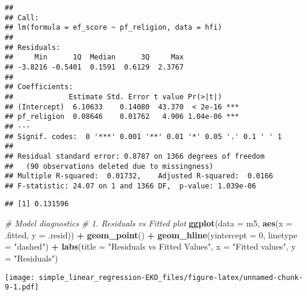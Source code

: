 \documentclass[
]{article}
\newenvironment{Shaded}{\begin{snugshade}}{\end{snugshade}}
\newcommand{\AttributeTok}[1]{\textcolor[rgb]{0.13,0.29,0.53}{#1}}
\newcommand{\CommentTok}[1]{\textcolor[rgb]{0.56,0.35,0.01}{\textit{#1}}}
\newcommand{\DecValTok}[1]{\textcolor[rgb]{0.00,0.00,0.81}{#1}}
\newcommand{\FunctionTok}[1]{\textcolor[rgb]{0.13,0.29,0.53}{\textbf{#1}}}
\newcommand{\NormalTok}[1]{#1}
\newcommand{\SpecialCharTok}[1]{\textcolor[rgb]{0.81,0.36,0.00}{\textbf{#1}}}
\newcommand{\StringTok}[1]{\textcolor[rgb]{0.31,0.60,0.02}{#1}}
\begin{document}
\begin{verbatim}
## 
## Call:
## lm(formula = ef_score ~ pf_religion, data = hfi)
## 
## Residuals:
##     Min      1Q  Median      3Q     Max 
## -3.8216 -0.5401  0.1591  0.6129  2.3767 
## 
## Coefficients:
##             Estimate Std. Error t value Pr(>|t|)    
## (Intercept)  6.10633    0.14080  43.370  < 2e-16 ***
## pf_religion  0.08646    0.01762   4.906 1.04e-06 ***
## ---
## Signif. codes:  0 '***' 0.001 '**' 0.01 '*' 0.05 '.' 0.1 ' ' 1
## 
## Residual standard error: 0.8787 on 1366 degrees of freedom
##   (90 observations deleted due to missingness)
## Multiple R-squared:  0.01732,    Adjusted R-squared:  0.0166 
## F-statistic: 24.07 on 1 and 1366 DF,  p-value: 1.039e-06
\end{verbatim}

\begin{Shaded}
\end{Shaded}

\begin{verbatim}
## [1] 0.131596
\end{verbatim}

\begin{Shaded}
\begin{Highlighting}[]
\CommentTok{\# Model diagnostics}
\CommentTok{\# 1. Residuals vs Fitted plot}
\FunctionTok{ggplot}\NormalTok{(}\AttributeTok{data =}\NormalTok{ m5, }\FunctionTok{aes}\NormalTok{(}\AttributeTok{x =}\NormalTok{ .fitted, }\AttributeTok{y =}\NormalTok{ .resid)) }\SpecialCharTok{+}
  \FunctionTok{geom\_point}\NormalTok{() }\SpecialCharTok{+}
  \FunctionTok{geom\_hline}\NormalTok{(}\AttributeTok{yintercept =} \DecValTok{0}\NormalTok{, }\AttributeTok{linetype =} \StringTok{"dashed"}\NormalTok{) }\SpecialCharTok{+}
  \FunctionTok{labs}\NormalTok{(}\AttributeTok{title =} \StringTok{"Residuals vs Fitted Values"}\NormalTok{,}
       \AttributeTok{x =} \StringTok{"Fitted values"}\NormalTok{, }
       \AttributeTok{y =} \StringTok{"Residuals"}\NormalTok{)}
\end{Highlighting}
\end{Shaded}

\texttt{[image: simple\_linear\_regression-EKO\_files/figure-latex/unnamed-chunk-9-1.pdf]}
\end{document}
